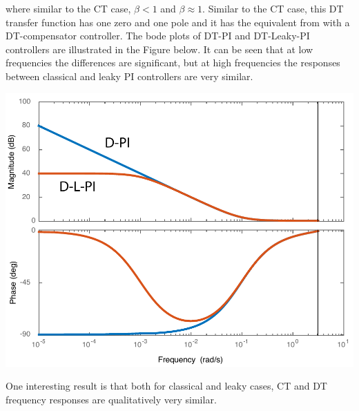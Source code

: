 \documentclass[twoside]{article}
\begin{document}
%
where similar to the CT case, $\beta < 1$ and $\beta \approx 1$.
Similar to the CT case, this DT transfer function has one zero and
one pole and it has the equivalent from with a DT-compensator 
controller. The bode plots of DT-PI and DT-Leaky-PI controllers
are illustrated in the Figure below. It can be seen that
at low frequencies the differences are significant,
but at high frequencies the responses between classical
and leaky PI controllers are very similar.
%
    \begin{center}
\begin{minipage}[h]{0.6\linewidth}
    \begin{center}
      \includegraphics[width=\textwidth]{DPI}
    \end{center}
\end{minipage}
    \end{center}
%
One interesting result is that both for classical and leaky
cases, CT and DT frequency responses are qualitatively very 
similar. 

\end{document}
